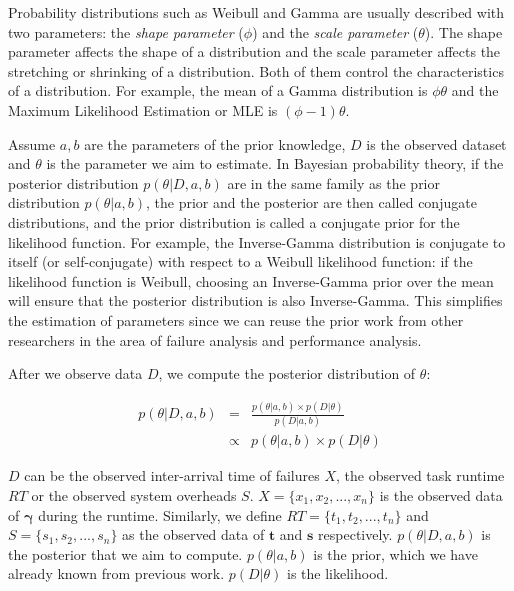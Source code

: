 Probability distributions such as Weibull and Gamma are usually described with two parameters: the \emph{shape parameter} ($\phi$) and the \emph{scale parameter} ($\theta$). The shape parameter affects the shape of a distribution and the scale parameter affects the stretching or shrinking of a distribution. Both of them control the characteristics of a distribution. For example, the mean of a Gamma distribution is $\phi\theta$ and the Maximum Likelihood Estimation or MLE is $(\phi-1)\theta$. 

Assume $a,b$ are the parameters of the prior knowledge, $D$ is the observed dataset and $\theta$ is the parameter we aim to estimate. In Bayesian probability theory, if the posterior distribution $p(\theta|D, a, b)$ are in the same family as the prior distribution $p(\theta|a, b)$, the prior and the posterior are then called conjugate distributions, and the prior distribution is called a conjugate prior for the likelihood function. For example, the Inverse-Gamma distribution is conjugate to itself (or self-conjugate) with respect to a Weibull likelihood function: if the likelihood function is Weibull, choosing an Inverse-Gamma prior over the mean will ensure that the posterior distribution is also Inverse-Gamma. This simplifies the estimation of parameters since we can reuse the prior work from other researchers \cite{Schroeder2006, Iosup2008, Sun2003, Chen2011} in the area of failure analysis and performance analysis. 

After we observe data $D$, we compute the posterior distribution of $\theta$:

\begin{eqnarray*}
	\displaystyle  
	p(\theta|D, a, b)&=&\frac{p(\theta|a, b)\times p(D|\theta)}{p(D|a, b)}\nonumber  \\
	&\propto&p(\theta|a, b)\times p(D|\theta)\nonumber 
\end{eqnarray*}

$D$ can be the observed inter-arrival time of failures $X$, the observed task runtime $RT$ or the observed system overheads $S$. 
$X=\{x_1, x_2, ..., x_n\}$ is the observed data of $\bm\gamma$ during the runtime. Similarly, we define $RT=\{t_1, t_2, ..., t_n\}$ and $S=\{s_1, s_2, ..., s_n\}$ as the observed data of $\bm t$ and $\bm s$ respectively. $p(\theta|D,a, b)$ is the posterior that we aim to compute. $p(\theta|a, b)$ is the prior, which we have already known from previous work. $p(D|\theta)$ is the likelihood. 



